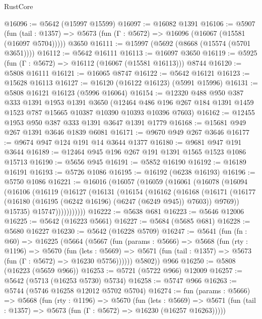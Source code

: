 \begin{lexlean}{RustCore}
\begin{coremodule}
@16096 := @5642 (@15997 @15599)
@16097 := @16082 @1391
@16106 := @5907
    (fun (tail : @1357) => @5673 (fun (Γ : @5672) => @16096 (@16067 (@15581 (@16097 @5704)))))
    @3650
@16111 := @15997 (@5692 (@8668 (@15574 (@5701 @3651))))
@16112 := @5642 @16111
@16113 := @16097 @3650
@16119 := @5925 (fun (Γ : @5672) => @16112 (@16067 (@15581 @16113))) @8744
@16120 := @5808 @16111
@16121 := @16065 @8747
@16122 := @5642 @16121
@16123 := @15628 @16113
@16127 := @16120 (@16122 @16123) (@5991 @15996)
@16131 := @5808 @16121 @16123 (@5996 @16064)
@16154 := @12320
    @488
    @950
    @387
    @333
    @1391
    @1953
    @1391
    @3650
    (@12464 @486 @196 @267 @184 @1391 @1459 @1523 @787 @15665 @10387 @10390 @10393 @10396 @7603)
@16162 := @12455 @1953 @950 @387 @333 @1391 @3647 @1391 @1779
@16168 := @15681 @949 @267 @1391 @3646 @1839 @6081
@16171 := @9670 @949 @267 @3646
@16177 := @9674 @947 @124 @191 @14 @3644 @1377
@16180 := @9681 @947 @191 @3644
@16189 := @12464 @945 @196 @267 @191 @1391 @1565 @1523 @1086 @15713
@16190 := @5656 @945
@16191 := @5852 @16190
@16192 := @16189 @16191
@16193 := @5726 @1086
@16195 := @16192 (@6238 @16193)
@16196 := @5750 @1086
@16221 := @16016
    (@16057
      (@16059
        (@16061
          (@16078
            (@16094
              (@16106
                (@16119
                  (@16127
                    (@16131
                      (@16154
                        (@16162
                          (@16168
                            (@16171
                              (@16177
                                (@16180 (@16195 (@6242 @16196) (@6247 (@6249 @945)) @7603))
                                @9769))
                            @15735)
                          @15747)))))))))))
@16222 := @5638 @681
@16223 := @5646 @12006
@16225 := @5642 (@16223 @5661)
@16227 := @5684 (@5685 @681)
@16228 := @5680 @16227
@16230 := @5642 (@16228 @5709)
@16247 := @5641
    (fun (fn : @60) =>
    @16225
      (@5664
        (@5667
          (fun (params : @5666) =>
          @5668
            (fun (rty : @1196) =>
            @5670
              (fun (lets : @5669) =>
              @5671 (fun (tail : @1357) => @5673 (fun (Γ : @5672) => @16230 @5756))))))
        @5802))
    @966
@16250 := @5808 (@16223 (@5659 @966))
@16253 := @5721 (@5722 @966) @12009
@16257 := @5642 (@5713 (@16253 @5730) @5734)
@16258 := @5747 @966
@16263 := @5744 (@5746 @16258 @12012 @5702 @5704)
@16274 := fun (params : @5666) =>
  @5668
    (fun (rty : @1196) =>
    @5670
      (fun (lets : @5669) =>
      @5671 (fun (tail : @1357) => @5673 (fun (Γ : @5672) => @16230 (@16257 @16263)))))

\end{coremodule}
\end{lexlean}
